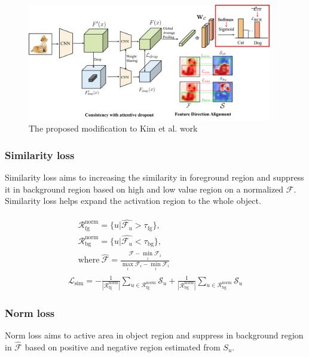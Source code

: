 \documentclass[conference]{IEEEtran}
\begin{document}
\begin{figure}
    \centering
    \includegraphics[width=0.95\textwidth]{Figures/architecture.png}
    \caption{The proposed modification to Kim et al. \cite{kim2022bridging} work}
    \label{fig:architecture}
\end{figure}

\subsubsection{Similarity loss}
Similarity loss aims to increasing the similarity in foreground region and suppress it in background region based on high and low value region on a normalized $\mathcal{F}$. Similarity loss helps expand the activation region to the whole object.

\begin{gather} \label{eq:sim loss}
    \begin{aligned}
         & \mathcal{R}_{\text{fg}}^{\text{norm}} = \{u|\hat{\mathcal{F}_u} > \tau_{\text{fg}}\},                                        & \\
         & \mathcal{R}_{\text{bg}}^{\text{norm}} = \{u|\hat{\mathcal{F}_u} < \tau_{\text{bg}}\},                                        & \\
         & \text{where} ~ \hat{\mathcal{F}} = \frac{\mathcal{F} - \min_i{\mathcal{F}_i}}{\max_i{\mathcal{F}_i} - \min_i{\mathcal{F}_i}} &
    \end{aligned}\\
    \mathcal{L}_{\text{sim}} = -\frac{1}{|\mathcal{R}_{\text{fg}}^{\text{norm}}|} \sum_{u\in\mathcal{R}_{\text{fg}}^{\text{norm}}}{\mathcal{S}_u} + \frac{1}{|\mathcal{R}_{\text{bg}}^{\text{norm}}|} \sum_{u\in\mathcal{R}_{\text{bg}}^{\text{norm}}}{\mathcal{S}_u}
\end{gather}

\subsubsection{Norm loss}
Norm loss aims to active area in object region and suppress in background region in $\hat{\mathcal{F}}$ based on positive and negative region estimated from $S_u$.
\end{document}
